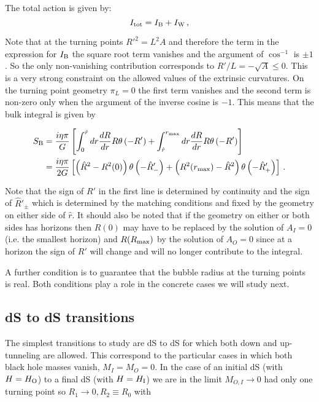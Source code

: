 \documentclass[a4paper,11pt]{article}
\numberwithin{equation}{section}
\newcommand{\be}{\begin{equation}}
\newcommand{\ee}{\end{equation}}
\numberwithin{equation}{section}
\begin{document}
The total action is given by:
\be
I_{\rm tot} = I_{{\rm B}} + I_{{\rm W }} \,,
\ee

Note that at the turning points $R'^2=L^2 A$ and therefore the term in the expression for $I_{\rm B}$ the square root term vanishes and the argument of $\cos^{-1}$ is $\pm 1$. So the only non-vanishing contribution corresponds to $R'/L=-\sqrt{A} \leq 0$. This is a very strong constraint on the allowed values of the extrinsic curvatures. 
On the turning point geometry $\pi_{L}=0$ the first term vanishes
and the second term is non-zero only when the argument of the inverse
cosine is $-1$. This means that the bulk integral is given by

\begin{align}
S_{{\rm B}} & =\frac{i\eta\pi}{G}\left[\int_{0}^{\hat{r}}dr\frac{dR}{dr}R\theta\left(-R'\right)+\int_{\hat{r}}^{r_{\rm max}}dr\frac{dR}{dr}R\theta\left(-R'\right)\right]\label{eq:Bulk}\\
 & =\frac{i\eta\pi}{2G}\left[\left(\hat{R}^{2}-R^{2}(0)\right)\theta\left(-\hat{R}'_{-}\right)+\left(R_{{\rm }}^{2}(r_{\rm max})-\hat{R}^{2}\right)\theta\left(-\hat{R}'_+\right)\right] \,. \label{eq:Bulk-1}
\end{align}

 Note that the sign of $R'$ in the first line is determined by continuity and the sign of $\hat{R}'_{\pm}$ which is determined by the matching
conditions and fixed by the geometry on either side of $\hat{r}$.
It should  also be noted that if the geometry on either or both
sides has horizons then $R(0)$ may have to be replaced by the solution of $A_{I}=0$ (i.e. the smallest horizon) and $R(R_{\rm max})$ by the solution of $A_{O}=0$ since at a horizon the sign of $R'$ will change and will no longer contribute to the integral. 


A further condition is to guarantee that the bubble radius at the turning points is  real. Both conditions play a role in the concrete cases we will study next.


\subsection{dS to dS transitions}

The simplest transitions to study are dS to dS for which both down and up-tunneling are allowed. This correspond to the particular cases in which both black hole masses vanish, $M_I=M_O=0$. In the case of an initial dS (with $H=H_{{\rm O}}$) to a final dS (with
$H=H_{{\rm I}}$) we are in the limit $M_{O,I}\rightarrow 0$ had only one turning point so $R_{1}\rightarrow 0,R_{2}\equiv R_{0}$ with
\end{document}
